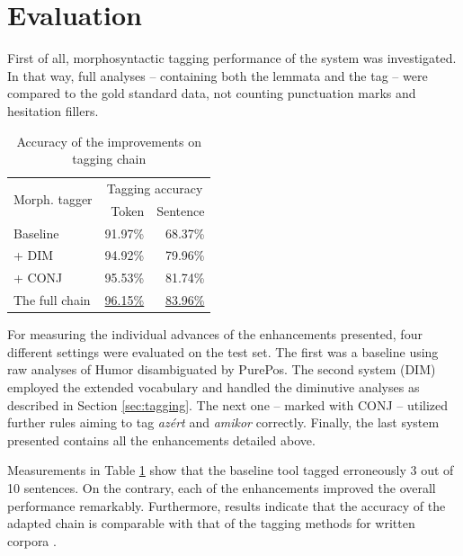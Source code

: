 \section{Evaluation}

First of all, morphosyntactic tagging performance of the system was investigated. 
In that way, full analyses -- containing both the lemmata and the tag -- were compared to the gold standard data, not counting punctuation marks and hesitation fillers.

\begin{table}[H]
\centering
\caption{Accuracy of the improvements on tagging chain}
\label{tab:eval_tag}
\begin{tabular}{ l r r} 
\hline
\multicolumn{1}{l}{\multirow{2}{*}{Morph. tagger}} & \multicolumn{2}{c}{\hspace{0.8cm} Tagging accuracy} \\
& Token &  Sentence \\
\hline
Baseline &  \hspace{0.8cm} 91.97\%  & \hspace{0.8cm} 68.37\% \\
\hspace{0.2cm} + DIM &  94.92\% & 79.96\% \\
\hspace{0.2cm} + CONJ & 95.53\% & 81.74\% \\
The full chain & \underline{96.15\%} & \underline{83.96\%} \\

\hline
\end{tabular}
\end{table}

For measuring the individual advances of the enhancements presented, four different settings were evaluated on the test set. 
The first was a baseline using raw analyses of Humor disambiguated by PurePos. 
The second system (DIM) employed the extended vocabulary and handled the diminutive analyses as described in Section \ref{sec:tagging}. 
The next one -- marked with CONJ -- utilized further rules aiming to tag \textit{azért} and \textit{amikor} correctly. 
Finally, the last system presented contains all the enhancements detailed above.

Measurements in Table \ref{tab:eval_tag} show that the baseline tool tagged erroneously 3 out of 10 sentences. 
On the contrary, each of the enhancements improved the overall performance remarkably.
Furthermore, results indicate that the accuracy of the adapted chain is comparable with that of the tagging methods for written corpora \cite{zsibrata2013magyarlanc}. 

